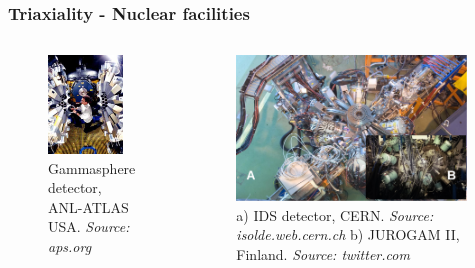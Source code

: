 \documentclass{beamer}
\begin{document}
\begin{frame}
	\frametitle{Triaxiality - Nuclear facilities}
	\begin{columns}
		\begin{figure}
		\centering
		\includegraphics[width=0.86\textwidth]{figures/gsfig.jpg}
		\caption{Gammasphere detector, ANL-ATLAS USA. \textit{Source: aps.org}}
	\end{figure}
	\begin{figure}
		\centering
		\includegraphics[width=0.98\textwidth]{figures/isolde_cern_2.png}
		\caption{a) IDS detector, CERN. \textit{Source: isolde.web.cern.ch} b) JUROGAM II, Finland. \textit{Source: twitter.com}}
		\end{figure}
	\end{columns}
\end{frame}
\end{document}
